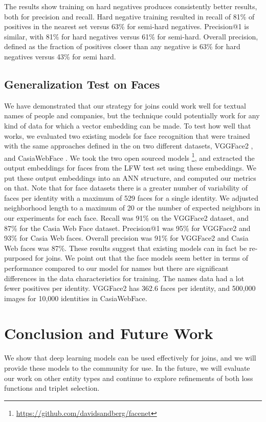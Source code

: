  The results show training on hard negatives produces consistently better results, both for precision and recall.  Hard negative training resulted in recall of 81\% of positives in the nearest set versus 63\% for semi-hard negatives.  Precision@1 is similar, with 81\% for hard negatives versus 61\% for semi-hard.  Overall precision, defined as the fraction of positives closer than any negative is 63\% for hard negatives versus 43\% for semi hard.

\subsection{Generalization Test on Faces}
We have demonstrated that our strategy for joins could work well for textual names of people and companies, but the technique could potentially work for any kind of data for which a vector embedding can be made.  To test how well that works, we evaluated two existing models for face recognition that were trained with the same approaches defined in the \cite{DBLP:conf/cvpr/SchroffKP15} on two different datasets, VGGFace2 \cite{DBLP:conf/fgr/CaoSXPZ18}, and CasiaWebFace \cite{DBLP:conf/cvpr/SchroffKP15}.  We took the two open sourced models \footnote{\url{https://github.com/davidsandberg/facenet}}, and extracted the output embeddings for faces from the LFW test set \cite{Huang2012a} using these embeddings.  We put these output embeddings into an ANN structure, and computed our metrics on that.  Note that for face datasets there is a greater number of variability of faces per identity with a maximum of 529 faces for a single identity.  We adjusted neighborhood length to a maximum of 20 or the number of expected neighbors in our experiments for each face.  Recall was 91\% on the VGGFace2 dataset, and 87\% for the Casia Web Face dataset.  Precision@1 was 95\% for VGGFace2 and 93\% for Casia Web faces.  Overall precision was 91\% for VGGFace2 and Casia Web faces was 87\%.  These results suggest that existing models can in fact be re-purposed for joins.  We point out that the face models seem better in terms of performance compared to our model for names but there are significant differences in the data characteristics for training.  The names data had a lot fewer positives per identity.  VGGFace2 has 362.6 faces per identity, and 500,000 images for 10,000 identities in CasiaWebFace. 

\section{Conclusion and Future Work}
We show that deep learning models can be used effectively for joins, and we will provide these models to the community for use.  In the future, we will evaluate our work on other entity types and continue to explore refinements of both loss functions and triplet selection.
